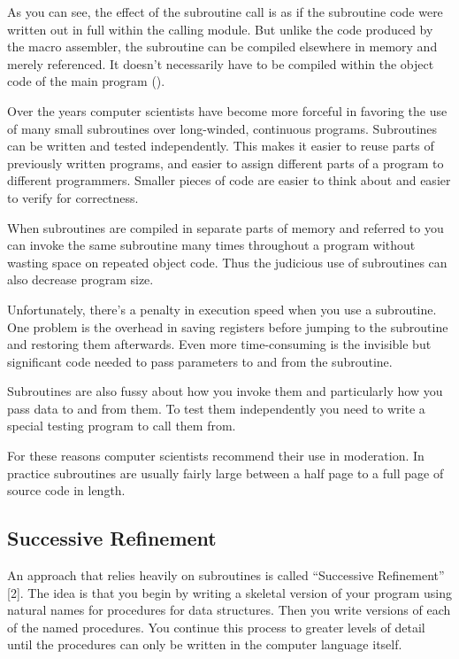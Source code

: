 As you can see, the effect of the subroutine call is as if the subroutine
code were written out in full within the calling module. But unlike
the code produced by the macro assembler, the subroutine can be compiled
elsewhere in memory and merely referenced. It doesn't necessarily
have to be compiled within the object code of the main program ().


Over the years computer scientists have become more forceful in favoring
the use of many small subroutines over long-winded, continuous programs.
Subroutines can be written and tested independently. This makes it
easier to reuse parts of previously written programs, and easier to
assign different parts of a program to different programmers. Smaller
pieces of code are easier to think about and easier to verify for
correctness.

When subroutines are compiled in separate parts of memory and referred
to you can invoke the same subroutine many times throughout a program
without wasting space on repeated object code. Thus the judicious
use of subroutines can also decrease program size. 

Unfortunately, there's a penalty in execution speed when you use a
subroutine. One problem is the overhead in saving registers before
jumping to the subroutine and restoring them afterwards. Even more
time-consuming is the invisible but significant code needed to pass
parameters to and from the subroutine.

Subroutines are also fussy about how you invoke them and particularly
how you pass data to and from them. To test them independently you
need to write a special testing program to call them from.

For these reasons computer scientists recommend their use in moderation.
In practice subroutines are usually fairly large between a half page
to a full page of source code in length.


\subsection{Successive Refinement}

An approach that relies heavily on subroutines is called {}``Successive
Refinement'' {[}2{]}. The idea is that you begin by writing a skeletal
version of your program using natural names for procedures for data
structures. Then you write versions of each of the named procedures.
You continue this process to greater levels of detail until the procedures
can only be written in the computer language itself.

